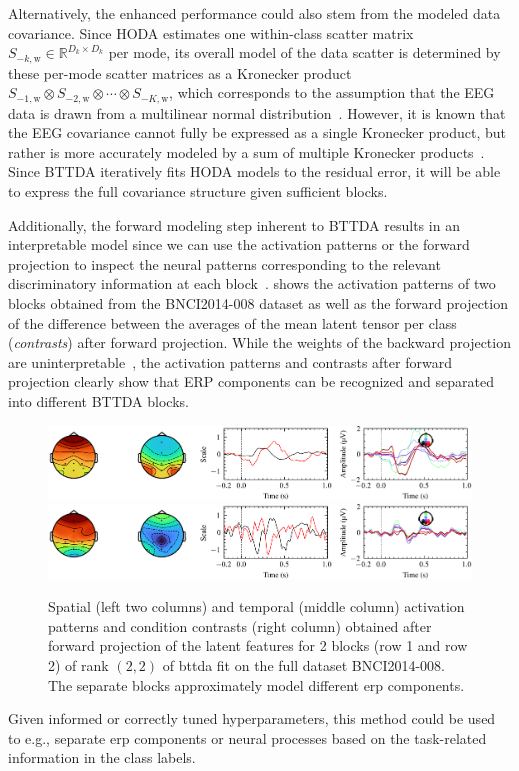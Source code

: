 Alternatively, the enhanced performance could also stem from the modeled data
covariance.
Since HODA estimates one within-class scatter matrix
$S_{-k,\text{w}}\in\mathbb{R}^{D_k\times D_k}$ per mode, its overall
model of the data scatter is determined by these per-mode scatter matrices as a
Kronecker product $S_{-1,\text{w}}\otimes S_{-2,\text{w}}\otimes\cdots\otimes S_{-K,\text{w}}$, which corresponds to the assumption that the EEG data is
drawn from a multilinear normal distribution~\cite{Ohlson2013}.
However, it is known that the EEG covariance cannot fully be expressed as a
single Kronecker product, but rather is more accurately modeled by a sum of
multiple Kronecker products~\cite{Bijma2005, Sosulski2022}.
Since BTTDA iteratively fits HODA models to the residual error, it will be able
to express the full covariance structure given sufficient blocks.

Additionally, the forward modeling step inherent to BTTDA results
in an interpretable model since we can use the activation patterns or the
forward projection to inspect the neural patterns corresponding to the
relevant discriminatory information at each block~\cite{Haufe2014}.
 shows the activation patterns
of two blocks obtained from the BNCI2014-008 dataset as well as the forward
projection of the difference between the averages of the mean latent tensor per
class (\emph{contrasts}) after forward projection.
While the weights of the backward projection are
uninterpretable~\cite{Haufe2014},
the activation patterns and contrasts after forward projection clearly show
that ERP components can be recognized and separated into different
BTTDA blocks.
\begin{figure}[t]
	\includegraphics[width=\linewidth]{figures/bttda/forward_block-0.png}
	\includegraphics[width=\linewidth]{figures/bttda/forward_block-1.png}
  \caption[Extracted \acs{bttda} activation patterns.]{%
    Spatial (left two columns) and temporal (middle column) activation patterns and
		condition contrasts (right column) obtained after forward projection of the latent
    features for 2 blocks (row 1 and row 2) of rank $(2,2)$ of \ac{bttda}
    fit on the full dataset BNCI2014-008.
    The separate blocks approximately model different \ac{erp}
		components.}
	\label{fig:forward}
\end{figure}
Given informed or correctly tuned hyperparameters, this method could be used to
e.g., separate \ac{erp} components or neural processes based on the task-related
information in the class labels.


